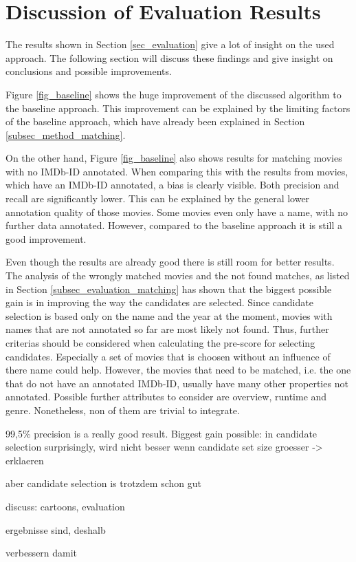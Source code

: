 \section{Discussion of Evaluation Results}
\label{sec_discussion}

The results shown in Section \ref{sec_evaluation} give a lot of insight on the used approach.
The following section will discuss these findings and give insight on conclusions and possible improvements.

Figure \ref{fig_baseline} shows the huge improvement of the discussed algorithm to the baseline approach.
This improvement can be explained by the limiting factors of the baseline approach, which have already been explained in Section \ref{subsec_method_matching}.

On the other hand, Figure \ref{fig_baseline} also shows results for matching movies with no IMDb-ID annotated.
When comparing this with the results from movies, which have an IMDb-ID annotated, a bias is clearly visible.
Both precision and recall are significantly lower.
This can be explained by the general lower annotation quality of those movies.
Some movies even only have a name, with no further data annotated.
However, compared to the baseline approach it is still a good improvement.

Even though the results are already good there is still room for better results.
The analysis of the wrongly matched movies and the not found matches, as listed in Section \ref{subsec_evaluation_matching} has shown that the biggest possible gain is in improving the way the candidates are selected.
Since candidate selection is based only on the name and the year at the moment, movies with names that are not annotated so far are most likely not found.
Thus, further criterias should be considered when calculating the pre-score for selecting candidates.
Especially a set of movies that is choosen without an influence of there name could help.
However, the movies that need to be matched, i.e. the one that do not have an annotated IMDb-ID, usually have many other properties not annotated.
Possible further attributes to consider are overview, runtime and genre.
Nonetheless, non of them are trivial to integrate.

99,5\% precision is a really good result.
Biggest gain possible: in candidate selection
surprisingly, wird nicht besser wenn candidate set size groesser -> erklaeren

aber candidate selection is trotzdem schon gut

discuss: cartoons, evaluation

ergebnisse sind, deshalb

verbessern damit

